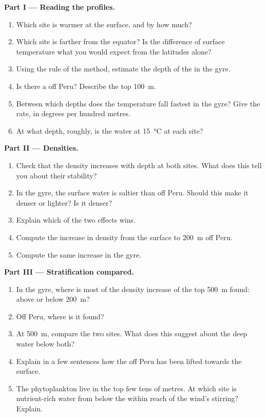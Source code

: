 \begin{problem}
\medskip
\noindent\textbf{Part I --- Reading the profiles.}
\begin{enumerate}
  \item Which site is warmer at the surface, and by how much?
  \item Which site is farther from the equator? Is the difference of
        surface temperature what you would expect from the latitudes alone?
  \item Using the rule of the method, estimate the depth of the 
        in the gyre.
  \item Is there a  off Peru? Describe the top \qty{100}{m}.
  \item Between which depths does the temperature fall fastest in the gyre?
        Give the rate, in degrees per hundred metres.
  \item At what depth, roughly, is the water at \qty{15}{\degreeCelsius} at
        each site?
\end{enumerate}

\medskip
\noindent\textbf{Part II --- Densities.}
\begin{enumerate}[resume]
  \item Check that the density increases with depth at both sites. What does
        this tell you about their stability?
  \item In the gyre, the surface water is saltier than off Peru. Should this
        make it denser or lighter? Is it denser?
  \item Explain which of the two effects wins.
  \item Compute the increase in density from the surface to \qty{200}{m}
        off Peru.
  \item Compute the same increase in the gyre.
\end{enumerate}

\medskip
\noindent\textbf{Part III --- Stratification compared.}
\begin{enumerate}[resume]
  \item In the gyre, where is most of the density increase of the top
        \qty{500}{m} found: above or below \qty{200}{m}?
  \item Off Peru, where is it found?
  \item At \qty{500}{m}, compare the two sites. What does this suggest about
        the deep water below both?
  \item Explain in a few sentences how the  off Peru has been
        lifted towards the surface.
  \item The phytoplankton live in the top few tens of metres. At which site
        is nutrient-rich water from below the  within reach of the
        wind's stirring? Explain.
\end{enumerate}


\end{problem}
